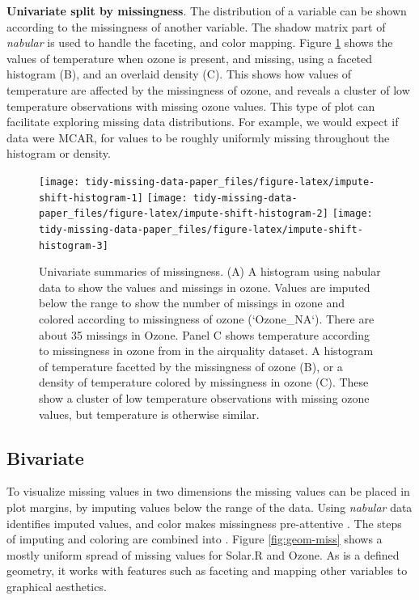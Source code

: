 \documentclass[
]{jss}
\begin{document}
\textbf{Univariate split by missingness}. The distribution of a variable can be shown according to the missingness of another variable. The shadow matrix part of \emph{nabular} is used to handle the faceting, and color mapping. Figure \ref{fig:impute-shift-histogram} shows the values of temperature when ozone is present, and missing, using a faceted histogram (B), and an overlaid density (C). This shows how values of temperature are affected by the missingness of ozone, and reveals a cluster of low temperature observations with missing ozone values. This type of plot can facilitate exploring missing data distributions. For example, we would expect if data were MCAR, for values to be roughly uniformly missing throughout the histogram or density.

\begin{CodeChunk}
\begin{figure}

{\centering \texttt{[image: tidy-missing-data-paper\_files/figure-latex/impute-shift-histogram-1]} \texttt{[image: tidy-missing-data-paper\_files/figure-latex/impute-shift-histogram-2]} \texttt{[image: tidy-missing-data-paper\_files/figure-latex/impute-shift-histogram-3]} 

}

\caption[Univariate summaries of missingness]{Univariate summaries of missingness. (A) A histogram using nabular data to show the values and missings in ozone. Values are imputed below the range to show the number of missings in ozone and colored according to missingness of ozone (`Ozone\_NA`). There are about 35 missings in Ozone. Panel C shows temperature according to missingness in ozone from in the airquality dataset. A histogram of temperature facetted by the missingness of ozone (B), or a density of temperature colored by missingness in ozone (C). These show a cluster of low temperature observations with missing ozone values, but temperature is otherwise similar.}\label{fig:impute-shift-histogram}
\end{figure}
\end{CodeChunk}

\hypertarget{bivariate}{%
\subsection{Bivariate}\label{bivariate}}

To visualize missing values in two dimensions the missing values can be placed in plot margins, by imputing values below the range of the data. Using \emph{nabular} data identifies imputed values, and color makes missingness pre-attentive \citep{treisman1985}. The steps of imputing and coloring are combined into . Figure \ref{fig:geom-miss} shows a mostly uniform spread of missing values for Solar.R and Ozone. As  is a defined  geometry, it works with features such as faceting and mapping other variables to graphical aesthetics.
\end{document}
